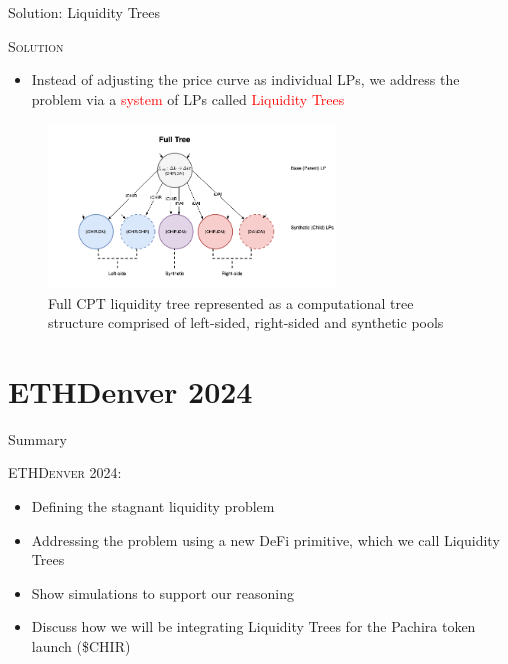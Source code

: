 \documentclass[10pt,xcolor=svgnames]{beamer} %
\newcommand{\red}[1]{\textcolor{red}{#1}}
\begin{document}
\begin{frame}{Solution: Liquidity Trees} 

\begin{exampleblock}{\textsc{Solution}}
\begin{itemize}
  \item Instead of adjusting the price curve as individual LPs, we address the problem via a \red{system} of LPs called \red{Liquidity Trees}
\end{itemize}
\end{exampleblock}

\begin{figure}[h!]
\includegraphics[width=3in]{img/full_tree.png}
\caption{Full CPT liquidity tree represented as a computational tree structure comprised of left-sided, right-sided and synthetic pools } 
\label{fig:full_tree}
\end{figure}

\end{frame}




\section{ETHDenver 2024}

\begin{frame}{Summary}

\begin{exampleblock}{\textsc{ETHDenver 2024:}}
\begin{itemize}
  \item Defining the stagnant liquidity problem
  \item Addressing the problem using a new DeFi primitive, which we call Liquidity Trees 
  \item Show simulations to support our reasoning
  \item Discuss how we will be integrating Liquidity Trees for the Pachira token launch (\$CHIR)
\end{itemize}
\end{exampleblock}
\end{frame}
\end{document}
